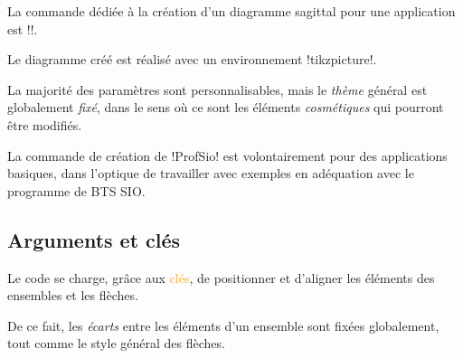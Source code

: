 \documentclass[french,a4paper,11pt]{article}
\newcommand\Cle[1]{{\small\sffamily\textlangle \textcolor{orange}{#1}\textrangle}}
\begin{document}
{\begin{cautionblock}
La commande dédiée à la création d'un diagramme sagittal pour une application est \motcletex!\DiagrammeSagittal!.

Le diagramme créé est réalisé avec un environnement \motcletex!tikzpicture!.
\end{cautionblock}

\begin{DemoCode}

\end{DemoCode}

\begin{DemoCode}[]
\end{DemoCode}

\begin{warningblock}
La majorité des paramètres sont personnalisables, mais le \textit{thème} général est globalement \textit{fixé}, dans le sens où ce sont les éléments \textit{cosmétiques} qui pourront être modifiés.

\smallskip

La commande de création de \packagetex!ProfSio! est volontairement pour des applications basiques, dans l'optique de travailler avec exemples en adéquation avec le programme de BTS SIO.
\end{warningblock}

\subsection{Arguments et clés}

\begin{DemoCode}

\end{DemoCode}

\begin{noteblock}
Le code se charge, grâce aux \Cle{clés}, de positionner et d'aligner les éléments des ensembles et les flèches.

De ce fait, les \textit{écarts} entre les éléments d'un ensemble sont fixées globalement, tout comme le style général des flèches.
\end{noteblock}

}
\end{document}
